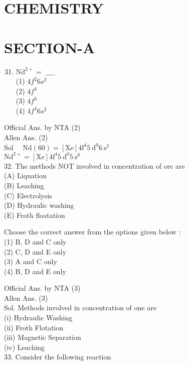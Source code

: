 \documentclass[10pt]{article}
\begin{document}
\section*{CHEMISTRY}
\section*{SECTION-A}
\begin{enumerate}
  \setcounter{enumi}{30}
  \item \(\mathrm{Nd}^{2+}=\) \(\_\_\_\_\)\\
(1) \(4 f^{2} 6 s^{2}\)\\
(2) \(4 f^{4}\)\\
(3) \(4 f^{3}\)\\
(4) \(4 f^{4} 6 s^{2}\)
\end{enumerate}

Official Ans. by NTA (2)\\
Allen Ans. (2)\\
Sol \(\quad \mathrm{Nd}(60)=[\mathrm{Xe}] 4 \mathrm{f}^{4} 5 \mathrm{~d}^{0} 6 \mathrm{~s}^{2}\)\\
\(\mathrm{Nd}^{2+}=[\mathrm{Xe}] 4 \mathrm{f}^{4} 5 \mathrm{~d}^{0} 5 \mathrm{~s}^{0}\)\\
32. The methods NOT involved in concentration of ore are\\
(A) Liquation\\
(B) Leaching\\
(C) Electrolysis\\
(D) Hydraulic washing\\
(E) Froth floatation

Choose the correct answer from the options given below :\\
(1) B, D and C only\\
(2) C, D and E only\\
(3) A and C only\\
(4) B, D and E only

Official Ans. by NTA (3)\\
Allen Ans. (3)\\
Sol. Methods involved in concentration of one are\\
(i) Hydraulic Washing\\
(ii) Froth Flotation\\
(iii) Magnetic Separation\\
(iv) Leaching\\
33. Consider the following reaction
\end{document}

